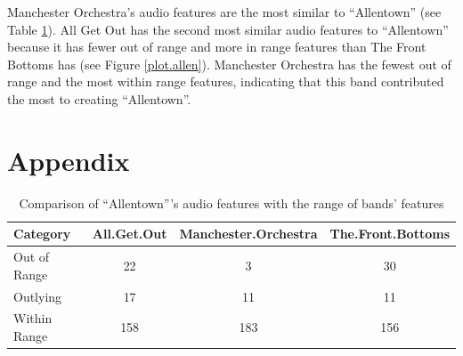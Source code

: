 \documentclass{article}\usepackage[]{graphicx}\usepackage[]{xcolor}
\begin{document}
\begin{multicols}{2}
Manchester Orchestra's audio features are the most similar to ``Allentown'' (see Table \ref{allentown.tab}). All Get Out has the second most similar audio features to ``Allentown'' because it has fewer out of range and more in range features than The Front Bottoms has (see Figure \ref{plot.allen}). Manchester Orchestra has the fewest out of range and the most within range features, indicating that this band contributed the most to creating ``Allentown''.

\vspace{2em}
\begin{tiny}

\end{tiny}
\end{multicols}

\newpage
\onecolumn
\section{Appendix}
\begin{table}[ht]
\centering
\begin{tabular}{|l|c|c|c|}
  \hline
Category & All.Get.Out & Manchester.Orchestra & The.Front.Bottoms \\ 
  \hline
Out of Range &  22 &   3 &  30 \\ 
  Outlying &  17 &  11 &  11 \\ 
  Within Range & 158 & 183 & 156 \\ 
   \hline
\end{tabular}
\caption{Comparison of ``Allentown'''s audio features with the range of bands' features} 
\label{allentown.tab}
\end{table}
\end{document}
